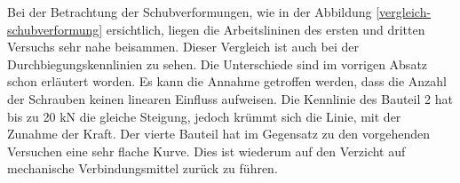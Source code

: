 \documentclass[12 pt,a4 paper ]{scrreprt}
\begin{document}
Bei der Betrachtung der Schubverformungen, wie in der Abbildung \ref{vergleich-schubverformung} ersichtlich, liegen die Arbeitslininen des ersten und dritten Versuchs sehr nahe beisammen. Dieser Vergleich ist auch bei der Durchbiegungskennlinien zu sehen. Die Unterschiede sind im vorrigen Absatz schon erläutert worden. Es kann die Annahme getroffen werden, dass die Anzahl der Schrauben keinen linearen Einfluss aufweisen. Die Kennlinie des Bauteil 2 hat bis zu 20 kN die gleiche Steigung, jedoch krümmt sich die Linie, mit der Zunahme der Kraft. Der vierte Bauteil hat im Gegensatz zu den vorgehenden Versuchen eine sehr flache Kurve. Dies ist wiederum auf den Verzicht auf mechanische Verbindungsmittel zurück zu führen.
\end{document}

